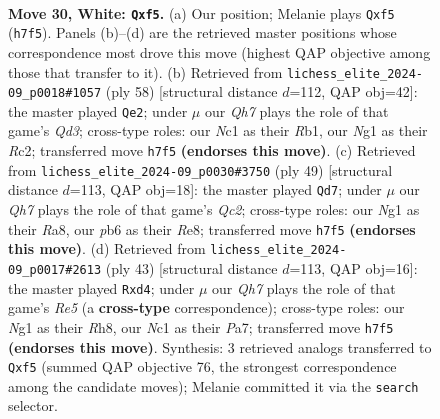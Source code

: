 \documentclass[11pt]{article}
\begin{document}
\clearpage

\begin{figure}[p]\centering
\begin{subfigure}{0.46\textwidth}\centering
\resizebox{\linewidth}{!}{%
\newchessgame
\chessboard[
  setfen={1rb2k2/4rP1Q/ppn5/2p1pqp1/P7/2P2P2/6PP/1KN1RBNR w - - 1 30},
  showmover=false,
  pgfstyle=straightmove, color=movearrow, markmove={h7-f5}
]}
\caption{}
\end{subfigure}\hfill
\begin{subfigure}{0.46\textwidth}\centering
\resizebox{\linewidth}{!}{%
\newchessgame
\chessboard[
  setfen={1rr5/4n1kp/3pp1p1/1P2p3/2NqP3/3Q4/2R2PPP/1R4K1 w - - 7 30},
  showmover=false,
  pgfstyle=straightmove, color=movearrow, markmove={d3-e2}
]}
\caption{}
\end{subfigure}
\\[4pt]
\begin{subfigure}{0.46\textwidth}\centering
\resizebox{\linewidth}{!}{%
\newchessgame
\chessboard[
  setfen={r3r1k1/p1q3b1/1pp3p1/5pPp/N1PP2n1/1P3QP1/PB4K1/R3R3 b - - 1 25},
  showmover=false,
  pgfstyle=straightmove, color=movearrow, markmove={c7-d7}
]}
\caption{}
\end{subfigure}\hfill
\begin{subfigure}{0.46\textwidth}\centering
\resizebox{\linewidth}{!}{%
\newchessgame
\chessboard[
  setfen={2k4r/ppp3p1/2p3p1/8/3Pr1nq/3N1Q1p/PPP2P2/R1B2K1R b - - 1 22},
  showmover=false,
  pgfstyle=straightmove, color=movearrow, markmove={e4-d4}
]}
\caption{}
\end{subfigure}
\caption{\textbf{Move 30, White: \texttt{Qxf5}.} (a) Our position; Melanie plays \texttt{Qxf5} (\texttt{h7f5}). Panels (b)--(d) are the retrieved master positions whose correspondence most drove this move (highest QAP objective among those that transfer to it). (b) Retrieved from \texttt{lichess\_elite\_2024-09\_p0018\#1057} (ply 58) [structural distance $d$=112, QAP obj=42]: the master played \texttt{Qe2}; under $\mu$ our \emph{Qh7} plays the role of that game's \emph{Qd3}; cross-type roles: our \emph{N}c1 as their \emph{R}b1, our \emph{N}g1 as their \emph{R}c2; transferred move \texttt{h7f5} \textbf{(endorses this move)}. (c) Retrieved from \texttt{lichess\_elite\_2024-09\_p0030\#3750} (ply 49) [structural distance $d$=113, QAP obj=18]: the master played \texttt{Qd7}; under $\mu$ our \emph{Qh7} plays the role of that game's \emph{Qc2}; cross-type roles: our \emph{N}g1 as their \emph{R}a8, our \emph{p}b6 as their \emph{R}e8; transferred move \texttt{h7f5} \textbf{(endorses this move)}. (d) Retrieved from \texttt{lichess\_elite\_2024-09\_p0017\#2613} (ply 43) [structural distance $d$=113, QAP obj=16]: the master played \texttt{Rxd4}; under $\mu$ our \emph{Qh7} plays the role of that game's \emph{Re5} (a \textbf{cross-type} correspondence); cross-type roles: our \emph{N}g1 as their \emph{R}h8, our \emph{N}c1 as their \emph{P}a7; transferred move \texttt{h7f5} \textbf{(endorses this move)}. Synthesis: 3 retrieved analogs transferred to \texttt{Qxf5} (summed QAP objective 76, the strongest correspondence among the candidate moves); Melanie committed it via the \texttt{search} selector.}
\label{fig:thought-m58}
\end{figure}
\end{document}
